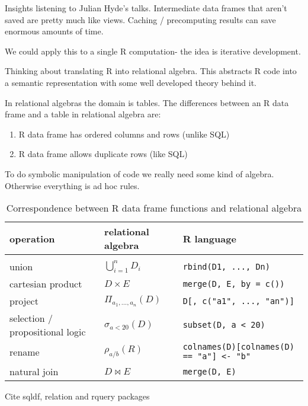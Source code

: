 \documentclass[12pt]{article}
\begin{document}
Insights listening to Julian Hyde's talks.
Intermediate data frames that aren't saved are pretty much like views.
Caching / precomputing results can save enormous amounts of time.

We could apply this to a single R computation- the idea is iterative
development.

Thinking about translating R into relational algebra.
This abstracts R code into a semantic representation with some well
developed theory behind it.

In relational algebras the domain is tables. The differences between an R
data frame and a table in relational algebra are:

\begin{enumerate}
    \item R data frame has ordered columns and rows (unlike SQL)
    \item R data frame allows duplicate rows (like SQL)
\end{enumerate}

To do symbolic manipulation of code we really need some kind of algebra.
Otherwise everything is ad hoc rules.



\begin{table}[]
\centering
    \caption{Correspondence between R data frame functions and relational
    algebra}
\label{tab-correspond}
\begin{tabular}{lll}
    \textbf{operation} & \textbf{relational algebra} & \textbf{R language}
    \\
\hline
    \\ union  & $\bigcup_{i=1}^n D_i$
        & \texttt{rbind(D1, ..., Dn)}
    \\ cartesian product   & $D \times E$
        & \texttt{merge(D, E, by = c())}
    \\ project & ${\displaystyle \Pi _{a_{1},\ldots ,a_{n}}(D)}$
        & \texttt{D[, c("a1", ..., "an")]}
    \\ selection / propositional logic & $\sigma_{a < 20} (D)$
        & \texttt{subset(D, a < 20)}
    \\ rename & $\rho_{a / b}(R)$
        & \texttt{colnames(D)[colnames(D) == "a"] <- "b"}
    \\ natural join & $D \Join E$
        & \texttt{merge(D, E)}
\end{tabular}
\end{table}


Cite sqldf, relation and rquery packages
\end{document}
